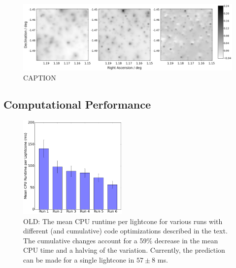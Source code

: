 \documentclass[%
 reprint,
 amsmath,amssymb,
 aps,nofootinbib
]{revtex4-1}
\begin{document}
\begin{figure}
    \centering
    \includegraphics[width=\textwidth]{figs-swe/thesis/kappamaps.png}
    \captionsetup{justification=raggedright,singlelinecheck=false}
    \caption{CAPTION}
    \label{fig:kappamaps}
\end{figure}
%

\subsection{Computational Performance} \label{comp_perform}

\begin{figure}
    \centering
    \includegraphics[width=0.475\textwidth]{figs-swe/thesis/profile_bar.png}
    \captionsetup{justification=raggedright,singlelinecheck=false}
    \caption{OLD: The mean CPU runtime per lightcone for various runs with different (and cumulative) code optimizations described in the text. The cumulative changes account for a 59\% decrease in the mean CPU time and a halving of the variation. Currently, the prediction can be made for a single lightcone in $57\pm8$ ms.}
    \label{fig:cpu_plot}
\end{figure}
\end{document}
